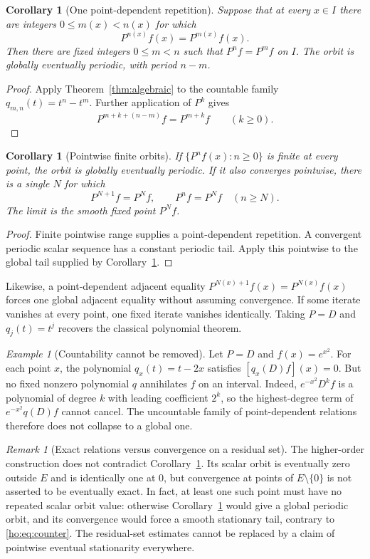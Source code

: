 \documentclass[11pt,reqno]{amsart}
\numberwithin{equation}{section}
\newtheorem{corollary}[theorem]{Corollary}
\theoremstyle{definition}
\theoremstyle{remark}
\newtheorem{remark}[theorem]{Remark}
\newtheorem{example}[theorem]{Example}
\begin{document}
\begin{corollary}[One point-dependent repetition]\label{cor:periodic}
Suppose that at every $x\in I$ there are integers $0\le m(x)<n(x)$ for which
\[
 P^{n(x)}f(x)=P^{m(x)}f(x).
\]
Then there are fixed integers $0\le m<n$ such that $P^nf=P^mf$ on $I$. The orbit is globally eventually periodic, with period $n-m$.
\end{corollary}
\begin{proof}
Apply Theorem~\ref{thm:algebraic} to the countable family $q_{m,n}(t)=t^n-t^m$. Further application of $P^k$ gives
\[
 P^{m+k+(n-m)}f=P^{m+k}f\qquad(k\ge0).
\]
\end{proof}

\begin{corollary}[Pointwise finite orbits]\label{cor:finiteorbit}
If $\{P^nf(x):n\ge0\}$ is finite at every point, the orbit is globally eventually periodic. If it also converges pointwise, there is a single $N$ for which
\[
 P^{N+1}f=P^Nf,\qquad P^nf=P^Nf\quad(n\ge N).
\]
The limit is the smooth fixed point $P^Nf$.
\end{corollary}
\begin{proof}
Finite pointwise range supplies a point-dependent repetition. A convergent periodic scalar sequence has a constant periodic tail. Apply this pointwise to the global tail supplied by Corollary~\ref{cor:periodic}.
\end{proof}
Likewise, a point-dependent adjacent equality $P^{N(x)+1}f(x)=P^{N(x)}f(x)$ forces one global adjacent equality without assuming convergence. If some iterate vanishes at every point, one fixed iterate vanishes identically. Taking $P=D$ and $q_j(t)=t^j$ recovers the classical polynomial theorem.

\begin{example}[Countability cannot be removed]
Let $P=D$ and $f(x)=e^{x^2}$. For each point $x$, the polynomial $q_x(t)=t-2x$ satisfies $[q_x(D)f](x)=0$. But no fixed nonzero polynomial $q$ annihilates $f$ on an interval. Indeed, $e^{-x^2}D^kf$ is a polynomial of degree $k$ with leading coefficient $2^k$, so the highest-degree term of $e^{-x^2}q(D)f$ cannot cancel. The uncountable family of point-dependent relations therefore does not collapse to a global one.
\end{example}

\begin{remark}[Exact relations versus convergence on a residual set]
The higher-order construction does not contradict Corollary~\ref{cor:periodic}. Its scalar orbit is eventually zero outside $E$ and is identically one at $0$, but convergence at points of $E\setminus\{0\}$ is not asserted to be eventually exact. In fact, at least one such point must have no repeated scalar orbit value: otherwise Corollary~\ref{cor:periodic} would give a global periodic orbit, and its convergence would force a smooth stationary tail, contrary to \eqref{ho:eq:counter}. The residual-set estimates cannot be replaced by a claim of pointwise eventual stationarity everywhere.
\end{remark}
\end{document}
